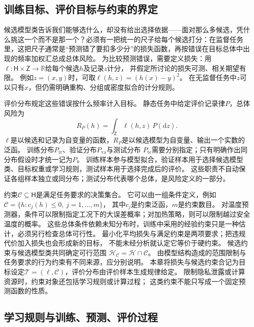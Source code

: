 \subsection{训练目标、评价目标与约束的界定}
\label{sec:future-learning-goal-objects}

候选模型类告诉我们能够选什么，却没有给出选择依据——面对那么多候选，凭什么挑这一个而不是那一个？必须有一把统一的尺子给每个候选打分：在监督任务里，这把尺子通常是“预测错了要扣多少分”的损失函数，再按错误在目标总体中出现的频率加权汇总成总体风险。
为比较预测错误，需要定义损失：用$\ell:\mathsf H\times\mathsf Z\to\mathbb R$给每个候选$h$及记录$z$计分，
并假定所讨论的损失可测、相关期望有限。
例如$z=(x,y)$时，可取$\ell(h,z)=(h(x)-y)^2$。
在无监督任务中$z$可以只有$x$，但仍需明确重构、分组或密度拟合的计分规则。

评价分布规定这些错误按什么频率计入目标。
静态任务中给定评价记录律$P$，总体风险为
\begin{equation}
  R_P(h)=\int_{\mathsf Z}\ell(h,z)\,P(\mathrm dz).
  \label{eq:future-unified-population-risk}
\end{equation}
$\ell$是以候选和记录为自变量的函数，$R_P$是以候选模型为自变量、输出一个实数的泛函。
训练分布$P_{\mathrm{tr}}$、验证分布$P_{\mathrm{va}}$与测试分布
$P_{\mathrm{te}}$需要分别指定；只有明确作出同分布假设时才统一记为$P$。
训练样本参与模型拟合，验证样本用于选择候选模型类、目标权重或学习规则，测试样本用于选择完成后的评价。
这些职责不自动保证各组样本独立或同分布；测试分布代表哪个总体，是风险定义的一部分。

约束$\mathcal C\subseteq\mathsf H$是满足任务要求的决策集合。
它可以由一组条件定义，例如$\mathcal C=\{h:c_j(h)\leq0,\ j=1,\ldots,m\}$，
其中$c_j$是约束泛函，$m$是约束数目。
对温度预测器，条件可以限制指定工况下的大误差概率；对加热策略，则可以限制越过安全温度的概率。
这些总体条件依赖未知分布时，训练中采用的经验约束只是一种估计，必须另行检查总体可行性。
最小化平均损失与满足约束是两项要求；把违规代价加入损失也会形成新的目标，
不能未经分析就认定它等价于硬约束。
候选约束与候选模型类共同确定可行范围
$\mathcal H_{\mathcal C}=\mathcal H\cap\mathcal C$。
由模型结构造成的范围限制与任务要求的行为约束有不同来源，应分别说明。
本章将损失与候选约束合记为目标设定$\mathcal T=(\ell,\mathcal C)$，评价分布由评价样本生成规律给定。
限制隐私泄露或计算资源时，约束对象还包括学习规则或计算过程；
这类约束不能只写成一个固定预测函数的性质。

\subsection{学习规则与训练、预测、评价过程}
\label{sec:future-learning-common-objects}
\label{sec:future-sampling-and-empirical-objective}
\label{sec:future-population-empirical-computation}

